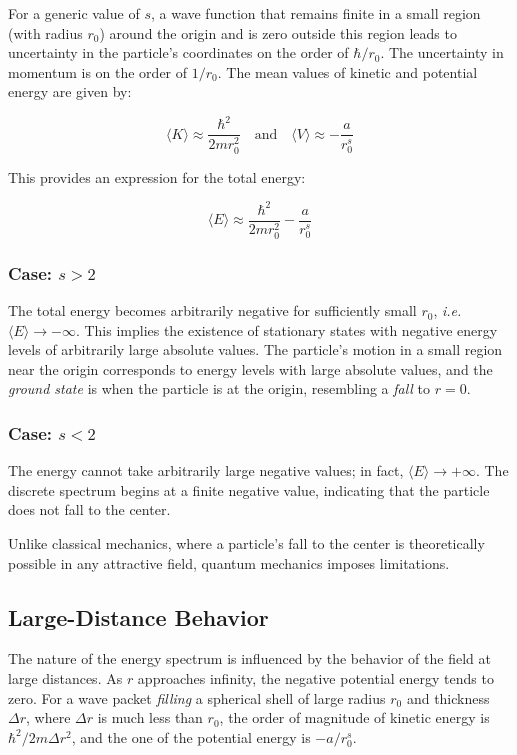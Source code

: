 For a generic value of \(s\), a wave function that remains finite in a small region (with radius \(r_0\)) around the origin and is zero outside this region leads to uncertainty in the particle's coordinates on the order of \(\hbar/r_0\). The uncertainty in momentum is on the order of \(1/r_0\). The mean values of kinetic and potential energy are given by:

\begin{equation*}
    \langle K \rangle \approx \frac{\hbar^2}{2 m r_0^2} \quad \text{and} \quad \langle V \rangle \approx -\frac{a}{r_0^s}
\end{equation*}

\noindent
This provides an expression for the total energy:

\begin{equation*}
    \langle E \rangle \approx \frac{\hbar^2}{2 m r_0^2} - \frac{a}{r_0^s}
\end{equation*}

\subsubsection{Case: \(s > 2\)}
The total energy becomes arbitrarily negative for sufficiently small \(r_0\), \textit{i.e. \( \langle E \rangle \to -\infty\)}. This implies the existence of stationary states with negative energy levels of arbitrarily large absolute values. The particle's motion in a small region near the origin corresponds to energy levels with large absolute values, and the \textit{ground state} is when the particle is at the origin, resembling a \textit{fall} to \(r = 0\).

\subsubsection{Case: \(s < 2\)}
The energy cannot take arbitrarily large negative values; in fact, \( \langle E \rangle \to +\infty\). The discrete spectrum begins at a finite negative value, indicating that the particle does not fall to the center.

Unlike classical mechanics, where a particle's fall to the center is theoretically possible in any attractive field, quantum mechanics imposes limitations.

\subsection*{Large-Distance Behavior}
The nature of the energy spectrum is influenced by the behavior of the field at large distances. As \(r\) approaches infinity, the negative potential energy tends to zero. For a wave packet \textit{filling} a spherical shell of large radius \(r_0\) and thickness \(\Delta r\), where \(\Delta r\) is much less than \(r_0\), the order of magnitude of kinetic energy is \(\hbar^2/2 m \Delta r^2\), and the one of the potential energy is \(-a/r_0^s\).

